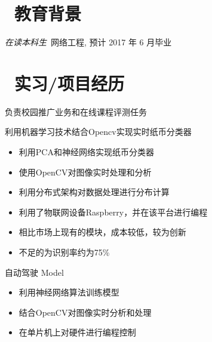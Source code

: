 \documentclass{resume}
\begin{document}


 
\section{\faGraduationCap\  教育背景}
\textit{在读本科生}\ 网络工程, 预计 2017 年 6 月毕业


\section{\faUsers\ 实习/项目经历}
负责校园推广业务和在线课程评测任务

\begin{onehalfspacing}
利用机器学习技术结合Opencv实现实时纸币分类器
\begin{itemize}
  \item 利用PCA和神经网络实现纸币分类器
  \item 使用OpenCV对图像实时处理和分析
  \item 利用分布式架构对数据处理进行分布计算
  \item 利用了物联网设备Raspberry，并在该平台进行编程
  \item 相比市场上现有的模块，成本较低，较为创新
  \item 不足的为识别率约为75\%
\end{itemize}
\end{onehalfspacing}

\begin{onehalfspacing}
自动驾驶 Model
\begin{itemize}
  \item 利用神经网络算法训练模型
  \item 结合OpenCV对图像实时分析和处理
  \item 在单片机上对硬件进行编程控制
\end{itemize}
\end{onehalfspacing}
\end{document}
